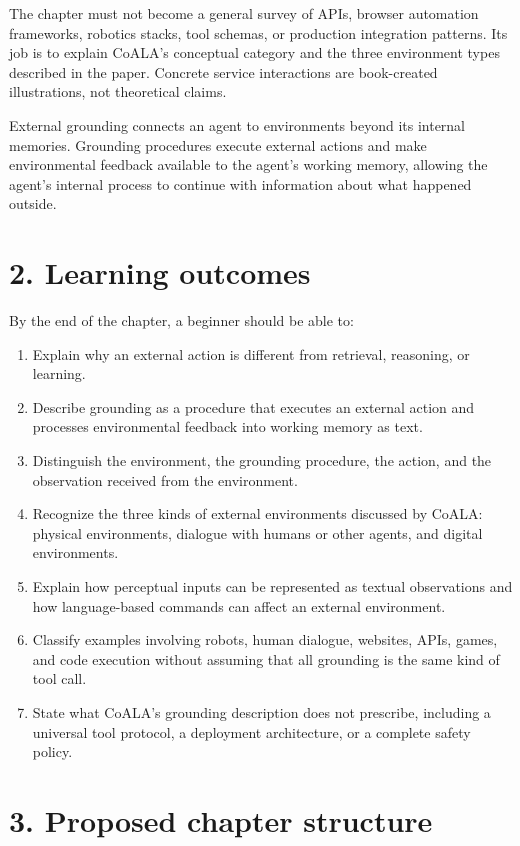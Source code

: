 The chapter must not become a general survey of APIs, browser automation frameworks, robotics stacks, tool schemas, or production integration patterns. Its job is to explain CoALA's conceptual category and the three environment types described in the paper. Concrete service interactions are book-created illustrations, not theoretical claims.

\begin{takeawaybox}
External grounding connects an agent to environments beyond its internal memories. Grounding procedures execute external actions and make environmental feedback available to the agent's working memory, allowing the agent's internal process to continue with information about what happened outside.
\end{takeawaybox}

\section*{2. Learning outcomes}
By the end of the chapter, a beginner should be able to:
\begin{enumerate}
  \item Explain why an external action is different from retrieval, reasoning, or learning.
  \item Describe grounding as a procedure that executes an external action and processes environmental feedback into working memory as text.
  \item Distinguish the environment, the grounding procedure, the action, and the observation received from the environment.
  \item Recognize the three kinds of external environments discussed by CoALA: physical environments, dialogue with humans or other agents, and digital environments.
  \item Explain how perceptual inputs can be represented as textual observations and how language-based commands can affect an external environment.
  \item Classify examples involving robots, human dialogue, websites, APIs, games, and code execution without assuming that all grounding is the same kind of tool call.
  \item State what CoALA's grounding description does not prescribe, including a universal tool protocol, a deployment architecture, or a complete safety policy.
\end{enumerate}

\section*{3. Proposed chapter structure}
\setcounter{chapter}{5}

